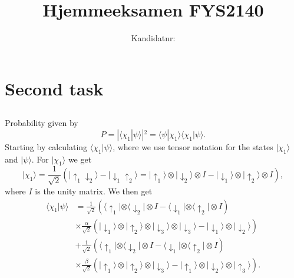 \documentclass[a4paper,10pt]{article}
\title{Hjemmeeksamen FYS2140}
\author{Kandidatnr: }
\date{}
\begin{document}
\maketitle


\section{ }
\subsection{ }

\section{Second task}
\subsection{ }
Probability given by
%
\begin{equation*}
P = |\langle \chi_1 | \psi\rangle|^2 = \langle \psi | \chi_1\rangle \langle \chi_1|\psi \rangle.
\end{equation*}
%
Starting by calculating $\langle \chi_1 | \psi \rangle$, where we use tensor notation for the states $|\chi_1\rangle $ and $|\psi\rangle$. For $|\chi_1\rangle$ we get
%
\begin{equation*}
|\chi_1\rangle = \frac{1}{\sqrt{2}}\left(|\uparrow_1 \downarrow
_2 \rangle - |\downarrow_1\uparrow
_2 \rangle = |\uparrow
_1 \rangle \otimes |\downarrow_2 \rangle \otimes I - |\downarrow_1 \rangle \otimes |\uparrow_2 \rangle \otimes I
 \right) ,
\end{equation*}
where $I$ is the unity matrix.  We then get
%
\begin{align*}
\langle \chi_1 | \psi \rangle &= \frac{1}{\sqrt{2}}\left(\langle \uparrow_1 | \otimes \langle \downarrow _2 | \otimes I - \langle \downarrow _1 | \otimes \langle \uparrow_2 | \otimes I\right) \\
&\times \frac{\alpha}{\sqrt{2}}\left(|\downarrow_1\rangle \otimes |\uparrow_2\rangle \otimes |\downarrow_3 \rangle \otimes |\downarrow_3 \rangle - |\downarrow_1\rangle \otimes |\downarrow_2 \rangle \right) \\
&+\frac{1}{\sqrt{2}}\left(\langle \uparrow_1 | \otimes \langle \downarrow _2 | \otimes I - \langle \downarrow _1 | \otimes \langle \uparrow_2 | \otimes I\right) \\
&\times \frac{\beta}{\sqrt{2}}\left(|\uparrow_1\rangle \otimes |\uparrow_2\rangle \otimes |\downarrow_3\rangle - |\uparrow_1\rangle \otimes |\downarrow_2 \rangle \otimes |\uparrow_3\rangle\right).
\end{align*}
\end{document}
